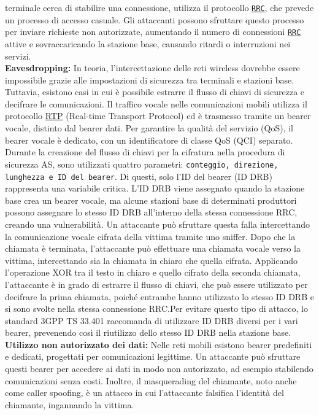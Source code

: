 \documentclass[english]{article}
\begin{document}
terminale cerca di stabilire una connessione, utilizza il protocollo \texttt{\hyperlink{RRC}{RRC}},
che prevede un processo di accesso casuale. Gli attaccanti possono sfruttare questo processo
per inviare richieste non autorizzate, aumentando il numero di connessioni \texttt{\hyperlink{RRC}{RRC}}
attive e sovraccaricando la stazione base, causando ritardi o interruzioni nei servizi.
\\[0.2cm]
\textbf{Eavesdropping:} In teoria, l'intercettazione delle reti wireless dovrebbe essere
impossibile grazie alle impostazioni di sicurezza tra terminali e stazioni base.
Tuttavia, esistono casi in cui è possibile estrarre il flusso di chiavi di sicurezza
e decifrare le comunicazioni. Il traffico vocale nelle comunicazioni mobili utilizza il protocollo
\hyperlink{RTP}{RTP} (Real-time Transport Protocol) ed è trasmesso tramite un bearer vocale,
distinto dal bearer dati. Per garantire la qualità del servizio (QoS), il bearer vocale è
dedicato, con un identificatore di classe QoS (QCI) separato. Durante la creazione del
flusso di chiavi per la cifratura nella procedura di sicurezza AS, sono utilizzati quattro
parametri: \texttt{conteggio, direzione, lunghezza e ID del bearer}. Di questi, solo l'ID
del bearer (ID DRB) rappresenta una variabile critica. L'ID DRB viene assegnato quando la
stazione base crea un bearer vocale, ma alcune stazioni base di determinati produttori
possono assegnare lo stesso ID DRB all'interno della stessa connessione RRC, creando una vulnerabilità.
Un attaccante può sfruttare questa falla intercettando la comunicazione vocale
cifrata della vittima tramite uno sniffer. Dopo che la chiamata è terminata,
l'attaccante può effettuare una chiamata vocale verso la vittima, intercettando sia la chiamata
in chiaro che quella cifrata. Applicando l'operazione XOR tra il testo in chiaro e quello cifrato
della seconda chiamata, l'attaccante è in grado di estrarre il flusso di chiavi,
che può essere utilizzato per decifrare la prima chiamata, poiché entrambe hanno utilizzato
lo stesso ID DRB e si sono svolte nella stessa connessione RRC.\@ Per evitare questo tipo di attacco,
lo standard 3GPP TS 33.401 raccomanda di utilizzare ID DRB diversi per i vari bearer,
prevenendo così il riutilizzo dello stesso ID DRB nella stazione base.
\\[0.2cm]
\textbf{Utilizzo non autorizzato dei dati:} Nelle reti mobili esistono bearer predefiniti
e dedicati, progettati per comunicazioni legittime. Un attaccante può sfruttare questi
bearer per accedere ai dati in modo non autorizzato, ad esempio stabilendo
comunicazioni senza costi. Inoltre, il masquerading del chiamante,
noto anche come caller spoofing, è un attacco in cui l'attaccante falsifica l'identità
del chiamante, ingannando la vittima.
\end{document}
